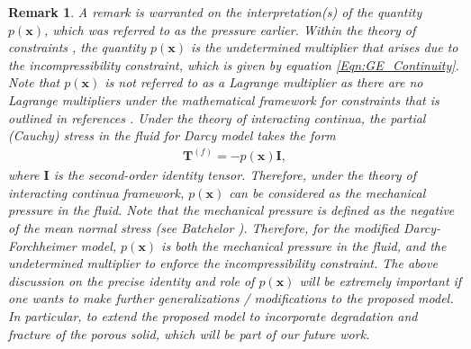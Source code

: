 \documentclass[11pt,reqno]{amsart}
\newtheorem{remark}[theorem]{Remark}
\begin{document}
\begin{remark}
  A remark is warranted on the interpretation(s) 
  of the quantity $p(\mathbf{x})$, which was 
  referred to as the pressure earlier. 
Within the theory of constraints 
  \cite{Carlson_Fried_Tortorelli_JE_2003_v70_p101,
    OReilly_Srinivasa_PRSLSA_2001_v457_p1307}, 
  the quantity $p(\mathbf{x})$ is the undetermined multiplier 
  that arises due to the incompressibility constraint, which 
  is given by equation \eqref{Eqn:GE_Continuity}. Note that 
  $p(\mathbf{x})$ is not referred to as a Lagrange multiplier 
  as there are no Lagrange multipliers under the mathematical 
  framework for constraints that is outlined in references 
  \cite{Carlson_Fried_Tortorelli_JE_2003_v70_p101,
    OReilly_Srinivasa_PRSLSA_2001_v457_p1307}. 
Under the theory of interacting continua, the partial 
  (Cauchy) stress in the fluid for Darcy model takes the 
  form 
\begin{align}
    \mathbf{T}^{(f)} = -p(\mathbf{x}) \mathbf{I},
  \end{align}
where $\mathbf{I}$ is the second-order identity tensor. 
  Therefore, under the theory of interacting continua 
  framework, $p(\mathbf{x})$ can be considered as the 
  mechanical pressure in the fluid. Note that the 
  mechanical pressure is defined as the negative of 
  the mean normal stress (see Batchelor \cite{Batchelor}). 
Therefore, for the modified Darcy-Forchheimer model, 
  $p(\mathbf{x})$ is both the mechanical pressure in the 
  fluid, and the undetermined multiplier to enforce the 
  incompressibility constraint. The above discussion 
  on the precise identity and role of $p(\mathbf{x})$ 
  will be extremely important if one wants to make 
  further generalizations / modifications to the 
  proposed model. In particular, to extend the 
  proposed model to incorporate degradation and 
  fracture of the porous solid, which will be 
  part of our future work. 
\end{remark}
\end{document}
